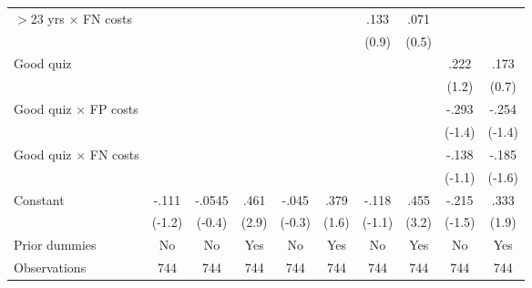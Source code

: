\begin{table}[htbp]
\begin{tabular}{l*{9}{c}}
$>$23 yrs $\times$ FN costs&                  &                  &                  &                  &                  &     .133         &     .071         &                  &                  \\
                &                  &                  &                  &                  &                  &    (0.9)         &    (0.5)         &                  &                  \\
Good quiz       &                  &                  &                  &                  &                  &                  &                  &     .222         &     .173         \\
                &                  &                  &                  &                  &                  &                  &                  &    (1.2)         &    (0.7)         \\
Good quiz $\times$ FP costs&                  &                  &                  &                  &                  &                  &                  &    -.293         &    -.254         \\
                &                  &                  &                  &                  &                  &                  &                  &   (-1.4)         &   (-1.4)         \\
Good quiz $\times$ FN costs&                  &                  &                  &                  &                  &                  &                  &    -.138         &    -.185         \\
                &                  &                  &                  &                  &                  &                  &                  &   (-1.1)         &   (-1.6)         \\
Constant        &    -.111         &   -.0545         &     .461\sym{***}&    -.045         &     .379         &    -.118         &     .455\sym{***}&    -.215         &     .333\sym{*}  \\
                &   (-1.2)         &   (-0.4)         &    (2.9)         &   (-0.3)         &    (1.6)         &   (-1.1)         &    (3.2)         &   (-1.5)         &    (1.9)         \\
Prior dummies   &       No         &       No         &      Yes         &       No         &      Yes         &       No         &      Yes         &       No         &      Yes         \\
\hline
Observations    &      744         &      744         &      744         &      744         &      744         &      744         &      744         &      744         &      744         \\

\end{tabular}
\end{table}
